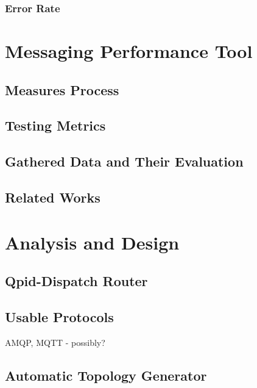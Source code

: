 \subsection{Error Rate}

\chapter{Messaging Performance Tool}
\label{Messaging Performance Tool}

\section{Measures Process}
\label{Measures Process}

\section{Testing Metrics}
\label{Testing Metrics}

\section{Gathered Data and Their Evaluation}
\label{Gathered Data and Their Evaluation}

\section{Related Works}
\label{Related Works}

\chapter{Analysis and Design}
\label{Analysis and Design}

\section{Qpid-Dispatch Router}

\section{Usable Protocols}
AMQP, MQTT - possibly?

\section{Automatic Topology Generator}

